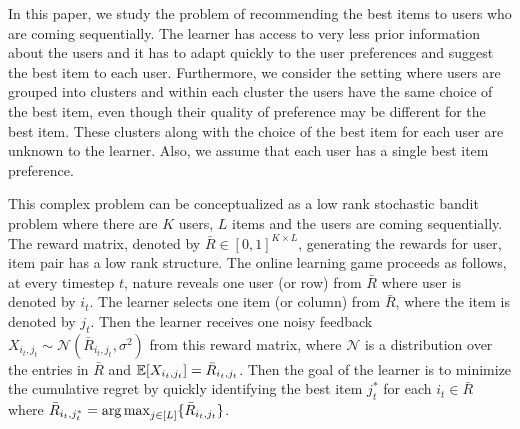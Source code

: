 In this paper, we study the problem of recommending the best items to users who are coming sequentially. The learner has access to very less prior information about the users and it has to adapt quickly to the user preferences and suggest the best item to each user. Furthermore, we consider the setting where users are grouped into clusters and within each cluster the users have the same choice of the best item, even though their quality of preference may be different for the best item. These clusters along with the choice of the best item for each user are unknown to the learner.  Also, we assume that each user has a single best item preference.

	This complex problem can be conceptualized as a low rank stochastic bandit problem where there are $K$ users, $L$ items and the users are coming sequentially. The reward matrix, denoted by $\bar{R}\in [0,1]^{K\times L}$,  generating the rewards for user, item pair has a low rank structure. The online learning game proceeds as follows, at every timestep $t$,  nature reveals one user (or row) from $\bar{R}$ where user is denoted by $i_t$. The learner selects one item (or column) from $\bar{R}$, where the item is denoted by $j_t$. Then the learner receives one noisy feedback $X_{i_t,j_t}\sim\mathcal{N}(\bar{R}_{i_t,j_t},\sigma^2)$ from this reward matrix, where $\mathcal{N}$ is a distribution over the entries in $\bar{R}$ and $\mathbb{E}[X_{i_t,j_t}] = \bar{R}_{i_t,j_t}$. Then the goal of the learner is to minimize the cumulative regret by quickly identifying the best item $j^*_t$ for each $i_t\in \bar{R}$ where $\bar{R}_{i_t,j^*_t} = \mathop{\rm arg\,max} _{j\in[L]}\lbrace \bar{R}_{i_t,j_t} \rbrace$. %